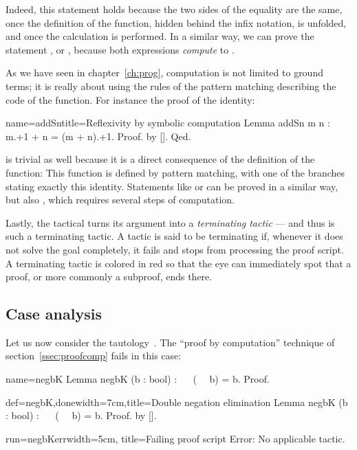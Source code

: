 Indeed, this statement holds because the two sides of the equality
are the same, once the definition of the  function, hidden
behind the infix \C{+} notation, is unfolded, and once the calculation
is performed. In a similar way, we can prove the statement
, or , because both expressions \emph{compute} to
.

As we have seen in chapter~\ref{ch:prog}, computation is not limited
to ground terms; it is really about using the rules of the pattern
matching describing the code of the function. For instance the proof
of the  identity:

\begin{coq}{name=addSn}{title=Reflexivity by symbolic computation}
Lemma addSn m n : m.+1 + n = (m + n).+1. Proof. by []. Qed.
\end{coq}
is trivial as well because it is a direct consequence of the
definition of the  function: This function is defined by
pattern matching, with one of the branches stating exactly this
identity. Statements like
 or  can be proved in a similar way, but
also , which requires several steps of computation.

Lastly, the  tactical turns its argument into a \emph{terminating
tactic} --- and thus   is such a terminating tactic. A tactic
is said to be terminating if, whenever it does not solve the goal
completely, it
fails and stops \Coq{} from processing the proof script.
A terminating tactic is colored in red so that
the eye can immediately spot that a
proof, or more commonly a subproof, ends there.

\subsection{Case analysis}\label{ssec:case}
Let us now consider the tautology~. The
``proof by computation'' technique of section~\ref{ssec:proofcomp}
fails in this case:

\begin{coqdef}{name=negbK}
Lemma negbK (b : bool) : ~~ (~~ b) = b.
Proof.
\end{coqdef}
\begin{coq-left}{def=negbK,done}{width=7cm,title=Double negation elimination}
Lemma negbK (b : bool) : ~~ (~~ b) = b.
Proof. by [].
\end{coq-left}
\begin{coqout-right}{run=negbKerr}{width=5cm, title=Failing proof script}
Error: No applicable tactic.
\end{coqout-right}


